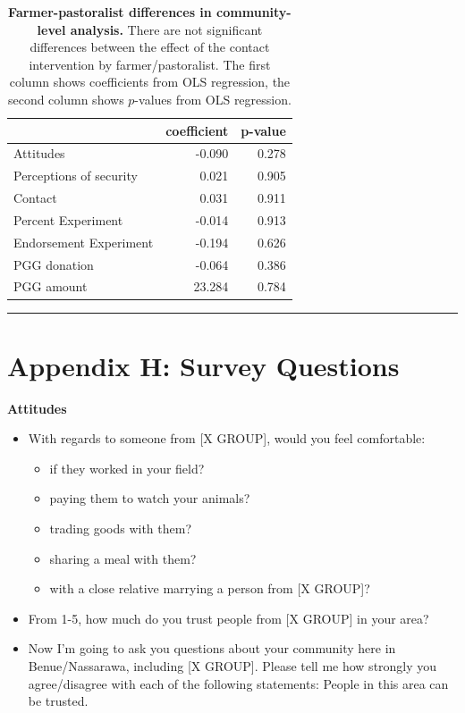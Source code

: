 \documentclass[
]{article}
\providecommand{\tightlist}{%
  \setlength{\itemsep}{0pt}\setlength{\parskip}{0pt}}
\begin{document}
\begin{table}[H]
\begin{center}
\label{tab:farm_tab}
\caption{\textbf{Farmer-pastoralist differences in community-level analysis.} There are not significant differences between the effect of the contact intervention by farmer/pastoralist. The first column shows coefficients from OLS regression, the second column shows $p$-values from OLS regression.}
\smallskip

\begin{tabular}{l|r|r}
\hline
  & coefficient & p-value\\
\hline
Attitudes & -0.090 & 0.278\\
\hline
Perceptions of security & 0.021 & 0.905\\
\hline
Contact & 0.031 & 0.911\\
\hline
Percent Experiment & -0.014 & 0.913\\
\hline
Endorsement Experiment & -0.194 & 0.626\\
\hline
PGG donation & -0.064 & 0.386\\
\hline
PGG amount & 23.284 & 0.784\\
\hline
\end{tabular}


\end{center}
\end{table}

\begin{center}\rule{0.5\linewidth}{0.5pt}\end{center}

\newpage

\hypertarget{appendix-h-survey-questions}{%
\section{Appendix H: Survey
Questions}\label{appendix-h-survey-questions}}

\textbf{Attitudes}

\begin{itemize}
\tightlist
\item
  With regards to someone from {[}X GROUP{]}, would you feel
  comfortable:

  \begin{itemize}
  \tightlist
  \item
    if they worked in your field?
  \item
    paying them to watch your animals?
  \item
    trading goods with them?
  \item
    sharing a meal with them?
  \item
    with a close relative marrying a person from {[}X GROUP{]}?
  \end{itemize}
\item
  From 1-5, how much do you trust people from {[}X GROUP{]} in your
  area?
\item
  Now I'm going to ask you questions about your community here in
  Benue/Nassarawa, including {[}X GROUP{]}. Please tell me how strongly
  you agree/disagree with each of the following statements: People in
  this area can be trusted.
\end{itemize}
\end{document}
